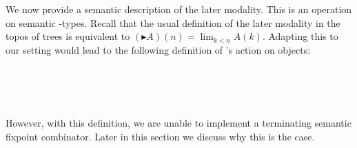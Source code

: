 We now provide a semantic description of the later modality. This is
an operation  on semantic -types.
Recall that the usual definition of the later modality in
the topos of trees \cite{BMSS-synthetic} is equivalent to
$(\blacktriangleright A) (n) = \lim_{k < n} A (k)$.
Adapting this to our setting would lead to the following definition of 's action on objects:
\begin{code}%
\>[0]\AgdaSpace{}%
\AgdaSpace{}%
\AgdaSymbol{(}\AgdaSpace{}%
\AgdaSymbol{:}\AgdaSpace{}%
\AgdaSpace{}%
\AgdaSymbol{)}\AgdaSpace{}%
\AgdaSymbol{(}\AgdaSpace{}%
\AgdaSymbol{:}\AgdaSpace{}%
\AgdaSymbol{)}\AgdaSpace{}%
\AgdaSymbol{:}\AgdaSpace{}%
\AgdaSpace{}%
\<%
\\
\>[0][@{}l@{\AgdaIndent{0}}]%
\>[2]\<%
\\
\>[2][@{}l@{\AgdaIndent{0}}]%
\>[4]\AgdaSpace{}%
\AgdaSymbol{:}\AgdaSpace{}%
\AgdaSymbol{(}\AgdaSpace{}%
\AgdaSymbol{:}\AgdaSpace{}%
\AgdaSpace{}%
\AgdaSymbol{)}\AgdaSpace{}%
\AgdaSpace{}%
\AgdaSpace{}%
\AgdaSpace{}%
\<%
\\
%
\>[4]\AgdaSpace{}%
\AgdaSymbol{:}\AgdaSpace{}%
\AgdaSymbol{(}\AgdaSpace{}%
\AgdaSymbol{:}\AgdaSpace{}%
\AgdaSpace{}%
\AgdaSymbol{)}\AgdaSpace{}%
\AgdaSymbol{(}\AgdaSpace{}%
\AgdaSymbol{:}\AgdaSpace{}%
\AgdaSpace{}%
\AgdaSymbol{(}\AgdaSpace{}%
\AgdaSymbol{))}\AgdaSpace{}%
\AgdaSpace{}%
\AgdaSpace{}%
\AgdaSpace{}%
\AgdaSpace{}%
\AgdaSpace{}%
\AgdaSymbol{(}\AgdaSpace{}%
\AgdaSymbol{)}\AgdaSpace{}%
\AgdaSpace{}%
\AgdaSpace{}%
\<%
\end{code}
However, with this definition, we are unable to
implement a terminating semantic fixpoint combinator.
Later in this section we discuss why this is the case.

